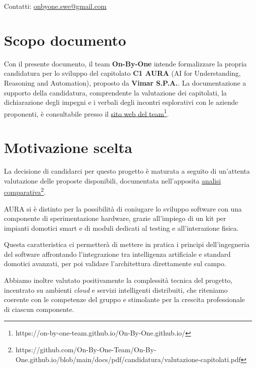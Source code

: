 \documentclass[11pt, a4paper]{article}
\begin{document}
\begin{titlepage}
    \vspace{0.5cm}
    
    {\large Contatti: \href{mailto:onbyone.swe@gmail.com}{onbyone.swe@gmail.com} }
    
\end{titlepage}

\newpage

\section{Scopo documento} Con il presente documento, il team \textbf{On-By-One} intende formalizzare la propria candidatura per lo sviluppo del capitolato \textbf{C1 AURA} (AI for Understanding, Reasoning and Automation), proposto da \textbf{Vimar S.P.A.}. 
La documentazione a supporto della candidatura, comprendente la valutazione dei capitolati, la dichiarazione degli impegni e i verbali degli incontri esplorativi con le aziende proponenti, è consultabile presso il \href{https://on-by-one-team.github.io/On-By-One.github.io/}{sito web del team}\footnote{https://on-by-one-team.github.io/On-By-One.github.io/}. \\

\section{Motivazione scelta} La decisione di candidarci per questo progetto è maturata a seguito di un'attenta valutazione delle proposte disponibili, documentata nell'apposita \href{https://github.com/On-By-One-Team/On-By-One.github.io/blob/main/docs/pdf/candidatura/valutazione-capitolati.pdf}{analisi comparativa}\footnote{https://github.com/On-By-One-Team/On-By-One.github.io/blob/main/docs/pdf/candidatura/valutazione-capitolati.pdf}.

\noindent AURA si è distinto per la possibilità di coniugare lo sviluppo software con una componente di sperimentazione hardware, grazie all'impiego di un kit per impianti domotici smart e di moduli dedicati al testing e all'interazione fisica.

\noindent Questa caratteristica ci permetterà di mettere in pratica i principi dell'ingegneria del software affrontando l'integrazione tra intelligenza artificiale e standard domotici avanzati, per poi validare l'architettura direttamente sul campo.

\noindent Abbiamo inoltre valutato positivamente la complessità tecnica del progetto, incentrato su ambienti \textit{cloud} e servizi intelligenti distribuiti, che riteniamo coerente con le competenze del gruppo e stimolante per la crescita professionale di ciascun componente.
\end{document}
